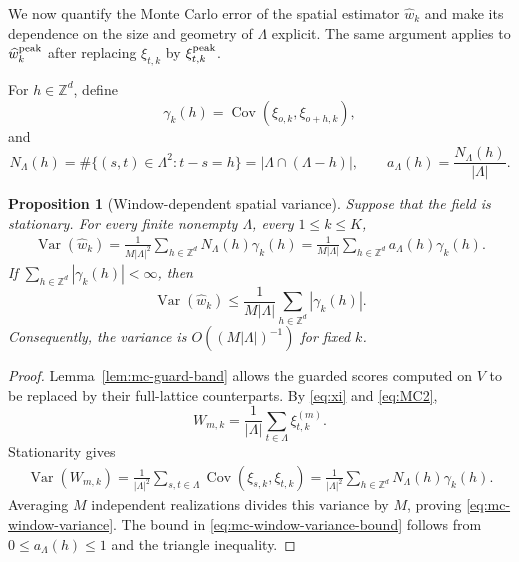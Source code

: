 \documentclass[aap,preprint]{imsart}
\theoremstyle{plain}
\newtheorem{proposition}[theorem]{Proposition}
\theoremstyle{definition}
\def\Z{{\mathbb Z}}
\begin{document}
We now quantify the Monte Carlo error of the spatial estimator $\widehat w_k$ and make its dependence on the size and geometry of $\Lambda$ explicit. The same
argument applies to $\widehat w_k^{\rm peak}$ after replacing
$\xi_{t,k}$ by $\xi_{t,k}^{\rm peak}$. 

For $h\in\Z^d$, define 
\[
\gamma_k(h)
=\operatorname{Cov}(\xi_{o,k}, \xi_{o+h,k}),
\]
and 
\begin{equation*}
	N_\Lambda(h)
	=\#\{(s,t)\in\Lambda^2:t-s=h\}
	=|\Lambda\cap(\Lambda-h)|,
	\qquad
	a_\Lambda(h)=\frac{N_\Lambda(h)}{|\Lambda|}.
\end{equation*}

\begin{proposition}[Window-dependent spatial variance]
	\label{prop:mc-window-variance}
	Suppose that the field is stationary.  For every finite nonempty
	$\Lambda$, every $1\leq k\leq K$, 
	\begin{equation}\label{eq:mc-window-variance}
		\begin{split}
		\operatorname{Var}(\widehat w_k)
		=\frac1{M|\Lambda|^2}
		\sum_{h\in\Z^d}N_\Lambda(h)\gamma_k(h)
		=\frac1{M|\Lambda|}
		\sum_{h\in\Z^d}a_\Lambda(h)\gamma_k(h).
	\end{split}
	\end{equation}
	If $\sum_{h\in\Z^d}|\gamma_k(h)|<\infty$,
	then
	\begin{equation}\label{eq:mc-window-variance-bound}
		\operatorname{Var}(\widehat w_k)
		\leq\frac1{M|\Lambda|}
		\sum_{h\in\Z^d}|\gamma_k(h)|.
	\end{equation}
	Consequently, the variance is $O((M|\Lambda|)^{-1})$ for fixed $k$.
\end{proposition}

\begin{proof}
	Lemma~\ref{lem:mc-guard-band} allows the guarded scores computed on $V$
	to be replaced by their full-lattice counterparts. By \eqref{eq:xi} and \eqref{eq:MC2}, 
	\[
	W_{m,k}
	=\frac1{|\Lambda|}\sum_{t\in\Lambda}\xi_{t,k}^{(m)}.
	\]
	Stationarity gives
	\begin{align*}
		\operatorname{Var}(W_{m,k})
		=\frac1{|\Lambda|^2}
		\sum_{s,t\in\Lambda}
		\operatorname{Cov}(\xi_{s,k},\xi_{t,k})=\frac1{|\Lambda|^2}
		\sum_{h\in\Z^d}N_\Lambda(h)\gamma_k(h).
	\end{align*}
	Averaging $M$ independent realizations divides this variance by $M$,
	proving \eqref{eq:mc-window-variance}.  The bound in \eqref{eq:mc-window-variance-bound} follows from $0\leq a_\Lambda(h)\leq1$ and the triangle inequality.
\end{proof}
\end{document}
